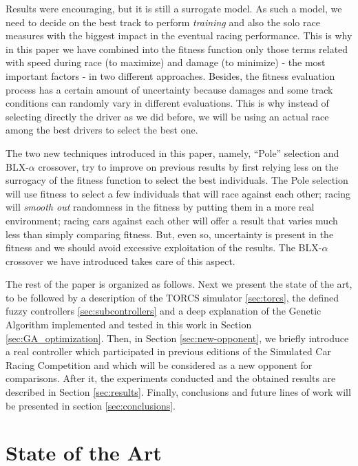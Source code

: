 \documentclass[conference]{IEEEtran}
\begin{document}
Results were encouraging, but it is still a surrogate model. As such a
model, we need to decide on the best track to perform {\em training}
and also the solo race measures with the biggest impact in the
eventual racing performance. This is why in this paper we have
combined into the fitness function only those terms related with speed
during race (to maximize) and damage (to minimize) - the most
important factors - in two different approaches. 
Besides, the fitness evaluation process has a certain amount of uncertainty because damages and some track conditions can randomly vary in different
evaluations. This is why instead of selecting directly the driver as
we did before, we will be using an actual race among the best drivers
to select the best one.

The two new techniques introduced in this paper, namely, ``Pole''
selection and BLX-$\alpha$ crossover, try to improve on previous
results by first relying less on the surrogacy of the fitness function
to select the best individuals. The Pole selection will use fitness to
select a few individuals that will race against each other; racing
will {\em smooth out} randomness in the fitness by putting them in a
more real environment; racing cars against each other will offer a
result that varies much less than simply comparing fitness. But, even
so, uncertainty is present in the fitness and we should avoid
excessive exploitation of the results. The BLX-$\alpha$ crossover we
have introduced takes care of this aspect.

The rest of the paper is organized as follows. Next we present the
state of the art, to be followed by a description of the TORCS
simulator \ref{sec:torcs}, the defined fuzzy controllers \ref{sec:subcontrollers} and a deep explanation of the Genetic Algorithm implemented and tested in this work in Section \ref{sec:GA_optimization}. Then, in Section \ref{sec:new-opponent}, we briefly introduce a real controller which participated in previous editions of the Simulated Car Racing Competition and which will be considered as a new opponent for comparisons.
After it, the experiments conducted and the obtained results are described in Section \ref{sec:results}. Finally, conclusions and future lines of work will be presented in section \ref{sec:conclusions}.


\section{State of the Art}
\label{sec:soa}
\end{document}
